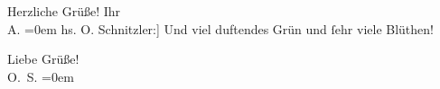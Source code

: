 \pstart
           Herzliche Grüße! Ihr{\\[\baselineskip]}\spacefill\mbox{A.}\pend
           \leftskip=0em{}\vspace{1em}
\pstart
           \noindent{}{[}hs. O. Schnitzler:{]} Und viel duftendes Grün und{ }ſehr viele Blüthen!\pend
           
\pstart
           Liebe Grüße!{\\[\baselineskip]}\spacefill\mbox{O. S.}\pend
           \leftskip=0em{}\endnumbering{}
\begin{anhang}
\end{anhang}\newcommand{\dateiname}{L04371}\newcommand{\titel}{Arthur und Olga Schnitzler an Gustav Schwarzkopf, 22. 5. 1904}\newcommand{\editorInnen}{Herausgegeben von Jahnke, SelmaMüller, Martin Anton}
